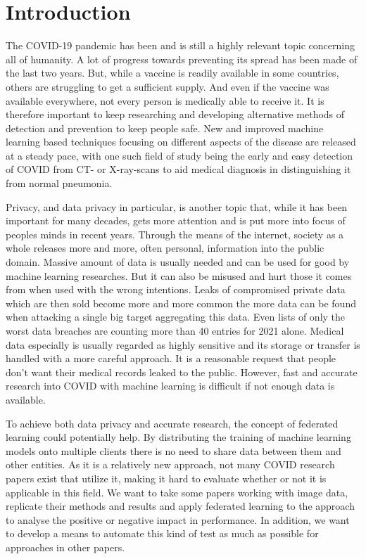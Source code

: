 \section{Introduction}

The COVID-19 pandemic has been and is still a highly relevant topic concerning all of humanity. A lot of progress towards preventing its spread has been made of the last two years. But, while a vaccine is readily available in some countries, others are struggling to get a sufficient supply. And even if the vaccine was available everywhere, not every person is medically able to receive it. It is therefore important to keep researching and developing alternative methods of detection and prevention to keep people safe. New and improved machine learning based techniques focusing on different aspects of the disease are released at a steady pace, with one such field of study being the early and easy detection of COVID from CT- or X-ray-scans to aid medical diagnosis in distinguishing it from normal pneumonia.

Privacy, and data privacy in particular, is another topic that, while it has been important for many decades, gets more attention and is put more into focus of peoples minds in recent years. Through the means of the internet, society as a whole releases more and more, often personal, information into the public domain. Massive amount of data is usually needed and can be used for good by machine learning researches. But it can also be misused and hurt those it comes from when used with the wrong intentions. Leaks of compromised private data which are then sold become more and more common the more data can be found when attacking a single big target aggregating this data. Even lists of only the worst data breaches are counting more than 40 entries for 2021 alone.\cite{data_breaches}
Medical data especially is usually regarded as highly sensitive and its storage or transfer is handled with a more careful approach. It is a reasonable request that people don't want their medical records leaked to the public. However, fast and accurate research into COVID with machine learning is difficult if not enough data is available. 

To achieve both data privacy and accurate research, the concept of federated learning could potentially help. By distributing the training of machine learning models onto multiple clients there is no need to share data between them and other entities. As it is a relatively new approach, not many COVID research papers exist that utilize it, making it hard to evaluate whether or not it is applicable in this field. We want to take some papers working with image data, replicate their methods and results and apply federated learning to the approach to analyse the positive or negative impact in performance. In addition, we want to develop a means to automate this kind of test as much as possible for approaches in other papers. 

